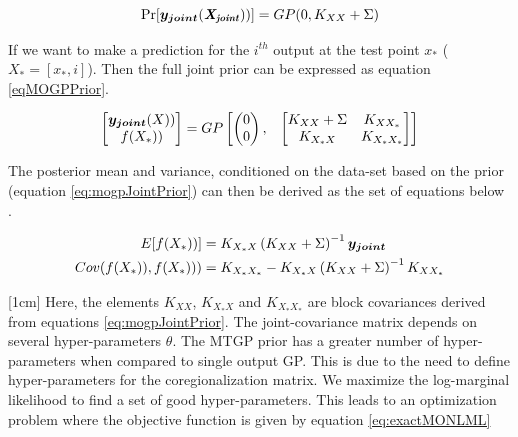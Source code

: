 \begin{equation}\label{eqNoisyMultiTaskPrior}
         \Pr[\boldsymbol{y_{joint}}(\bm{\mathit{X_{joint}}}))] = GP(0, K_{XX} + \Sigma)
\end{equation}
      
If we want to make a prediction for the $i^{th}$ output at the test point $x_{*}$ ($X_{*} = [x_{*}, i]$). Then the full joint prior can be expressed as equation \ref{eqMOGPPrior}.
 
 \begin{equation}\label{eqMOGPPrior}
 \begin{bmatrix}
   \boldsymbol{y_{joint}}(X))\\ 
   f(X_{*}))
   \end{bmatrix} = GP\begin{bmatrix}
   \begin{pmatrix}
   0\\ 
   0
   \end{pmatrix}, 
   & 
   \begin{bmatrix}
   K_{XX} + \Sigma & K_{XX_{*}}\\ 
   K_{X_{*}X} & K_{X_{*}X_{*}}
   \end{bmatrix} 

   \end{bmatrix} 
 \end{equation}

  
The posterior mean and variance, conditioned on the data-set based on the prior (equation \ref{eq:mogpJointPrior}) can then be derived as the set of equations below .

\begin{align}
  E[f(X_{*}))] & = K_{X_{*}X}\left ( K_{XX} + \Sigma \right )^{-1}\boldsymbol{y_{joint}} \label{eq:predictiveMOMean} \\ 
  Cov(f(X_{*})), f(X_{*}))) & = K_{X_{*}X_{*}} - K_{X_{*}X}\left ( K_{XX} + \Sigma \right )^{-1}K_{XX_{*}} \label{eq:predictiveMOCovariance}
\end{align}
  
[1cm]
Here, the elements \(K_{XX}\), \(K_{X_{*}X}\) and \(K_{X_{*}X_{*}}\) are block covariances derived from equations \ref{eq:mogpJointPrior}. The joint-covariance matrix depends on several hyper-parameters \(\theta\). The MTGP prior has a greater number of hyper-parameters when compared to single output GP. This is due to the need to define hyper-parameters for the coregionalization matrix. We maximize the log-marginal likelihood to find a set of good hyper-parameters. This leads to an optimization problem where the objective function is given by equation \ref{eq:exactMONLML} 
  
